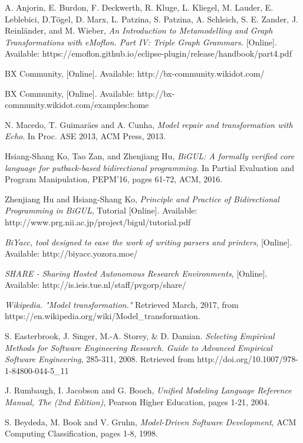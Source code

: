 \begin{thebibliography}{1}
	 A. Anjorin, E. Burdon, F. Deckwerth, R. Kluge, L. Kliegel, M. Lauder, E. Leblebici, D.T\"ogel, D. Marx, L. Patzina, S. Patzina, A. Schleich, S. E. Zander, J. Reinl\"ander, and M. Wieber, {\em An Introduction to	Metamodelling and Graph Transformations with eMoflon. Part IV: Triple Graph Grammars.} [Online]. Available: 
	https://emoflon.github.io/eclipse-plugin/release/handbook/part4.pdf
	
	 BX Community, [Online]. Available: http://bx-community.wikidot.com/
	
	 BX Community, [Online]. Available: http://bx-community.wikidot.com/examples:home
	
	 N. Macedo, T. Guimar\"aes and A. Cunha, {\em Model repair and transformation with Echo}. In Proc. ASE 2013, ACM Press, 2013.
	
	 Hsiang-Shang Ko, Tao Zan, and Zhenjiang Hu, {\em BiGUL: A formally verified core language for putback-based bidirectional programming.} In Partial Evaluation and Program Manipulation, PEPM'16, pages 61-72, ACM, 2016.
	
	 Zhenjiang Hu and Hsiang-Shang Ko,  {\em Principle and Practice of Bidirectional Programming in BiGUL}, Tutorial [Online]. Available: http://www.prg.nii.ac.jp/project/bigul/tutorial.pdf
	
	 {\em BiYacc, tool designed to ease the work of writing parsers and printers}, [Online]. Available: http://biyacc.yozora.moe/
	
	 {\em SHARE - Sharing Hosted Autonomous Research Environments}, [Online]. Available: http://is.ieis.tue.nl/staff/pvgorp/share/
	
	 {\em Wikipedia. "Model transformation."} Retrieved March, 2017, from https://en.wikipedia.org/wiki/Model{\_}transformation.
	
	 S. Easterbrook, J. Singer, M.-A. Storey, \& D. Damian. {\em Selecting Empirical Methods for Software Engineering Research. Guide to Advanced Empirical Software Engineering}, 285-311, 2008. Retrieved from http://doi.org/10.1007/978-1-84800-044-5\_11
	
	 J. Rumbaugh, I. Jacobson and G. Booch, {\em Unified Modeling Language Reference Manual, The (2nd Edition)}, Pearson Higher Education, pages 1-21, 2004.
	
	 S. Beydeda, M. Book and V. Gruhn, {\em Model-Driven Software Development}, ACM Computing Classification, pages 1-8, 1998.
	

\end{thebibliography}
